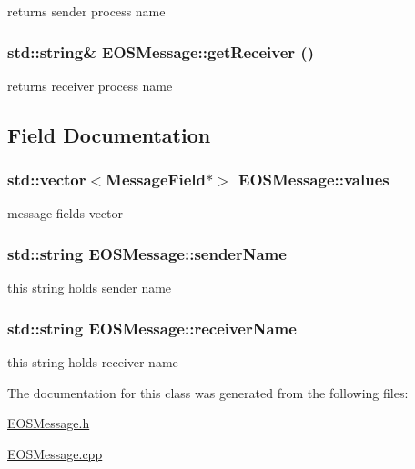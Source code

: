 returns sender process name 

\hypertarget{classEOSMessage_190437e488f9966c3a66efc6343dd2ff}{
\subsubsection[{getReceiver}]{\setlength{\rightskip}{0pt plus 5cm}std::string\& EOSMessage::getReceiver ()}}
\label{classEOSMessage_190437e488f9966c3a66efc6343dd2ff}


returns receiver process name 



\subsection{Field Documentation}
\hypertarget{classEOSMessage_96ec4e4136d8098a9de40eda92f49dc2}{
\subsubsection[{values}]{\setlength{\rightskip}{0pt plus 5cm}std::vector$<${\bf MessageField}$\ast$$>$ {\bf EOSMessage::values}}}
\label{classEOSMessage_96ec4e4136d8098a9de40eda92f49dc2}


message fields vector 

\hypertarget{classEOSMessage_0d4527e99c9d665cd65b3cd753ef59df}{
\subsubsection[{senderName}]{\setlength{\rightskip}{0pt plus 5cm}std::string {\bf EOSMessage::senderName}}}
\label{classEOSMessage_0d4527e99c9d665cd65b3cd753ef59df}


this string holds sender name 

\hypertarget{classEOSMessage_e2b133e9168915c7c0daf1116aed816b}{
\subsubsection[{receiverName}]{\setlength{\rightskip}{0pt plus 5cm}std::string {\bf EOSMessage::receiverName}}}
\label{classEOSMessage_e2b133e9168915c7c0daf1116aed816b}


this string holds receiver name 



The documentation for this class was generated from the following files:\begin{CompactItemize}
\item 
\hyperlink{EOSMessage_8h}{EOSMessage.h}\item 
\hyperlink{EOSMessage_8cpp}{EOSMessage.cpp}\end{CompactItemize}
